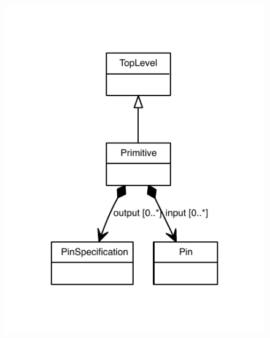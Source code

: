 \begin{figure}[ht]
\begin{center}
\includegraphics[scale=0.8]{uml/Primitive_abstraction_hierarchy.pdf}
\end{center}
\end{figure}

